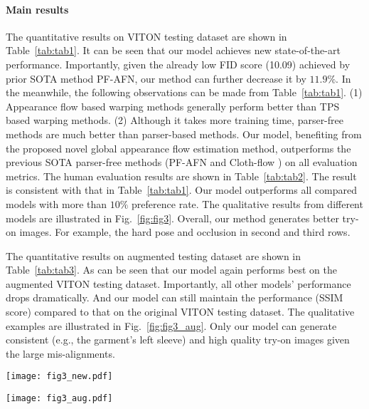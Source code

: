\documentclass[10pt,twocolumn,letterpaper]{article}
\begin{document}
\paragraph{Main results} The quantitative results on VITON testing dataset are  shown in Table~\ref{tab:tab1}. It can be seen that our model achieves new state-of-the-art performance. Importantly, given the already low FID score (10.09) achieved by prior SOTA method PF-AFN,  our method can further decrease it by $11.9\%$. In the meanwhile, the following observations can be made from  Table~\ref{tab:tab1}. (1) Appearance flow based warping methods generally perform better than TPS based warping methods. (2) Although it takes more training time, parser-free methods are much better than parser-based methods. Our model, benefiting from the proposed novel global appearance flow estimation method, outperforms the previous SOTA parser-free methods (PF-AFN \cite{ge2021parser} and Cloth-flow \cite{han2019clothflow}) on all evaluation metrics.  
The human evaluation results are shown in Table~\ref{tab:tab2}. The result is consistent with that in Table~\ref{tab:tab1}. Our model outperforms all compared models with more than $10\%$ preference rate. The qualitative results from different models are illustrated in Fig.~\ref{fig:fig3}. Overall, our method generates better try-on images. For example, the hard pose and occlusion in second and third rows. 

The quantitative results on augmented testing dataset are shown in Table~\ref{tab:tab3}. As can be seen that our model again performs best on the augmented VITON testing dataset. Importantly, all other models' performance drops dramatically. And our model can still maintain the performance (SSIM score) compared to that on the original VITON testing dataset. The qualitative examples are illustrated in Fig.~\ref{fig:fig3_aug}. Only our model can generate consistent (e.g., the garment's left sleeve) and high quality try-on images given the large mis-alignments.
\vspace{-0.4cm}
\begin{figure*}[t!]
    \centering
    \texttt{[image: fig3\_new.pdf]}
    \caption{Qualitative results from different models (CP-VTON++ \cite{minar2020cp}, ACGPN \cite{yang2020towards}, PF-AFN \cite{ge2021disentangled} and ours) on VITON testing dataset.}
    \vspace{-0.0cm}
    \label{fig:fig3}
\end{figure*}

\begin{figure*}[t!]
    \centering
    \texttt{[image: fig3\_aug.pdf]}
    \caption{Illustrating different VTON models' robustness to the randomly positioned person image. First row uses original person image as input. And second row uses vertically shifted person image as input. ACGPN \cite{yang2020towards}, Cloth-flow \cite{han2019clothflow}, PF-AFN \cite{ge2021parser}.}
    \vspace{-0.4cm}
    \label{fig:fig3_aug}
\end{figure*}
\end{document}
